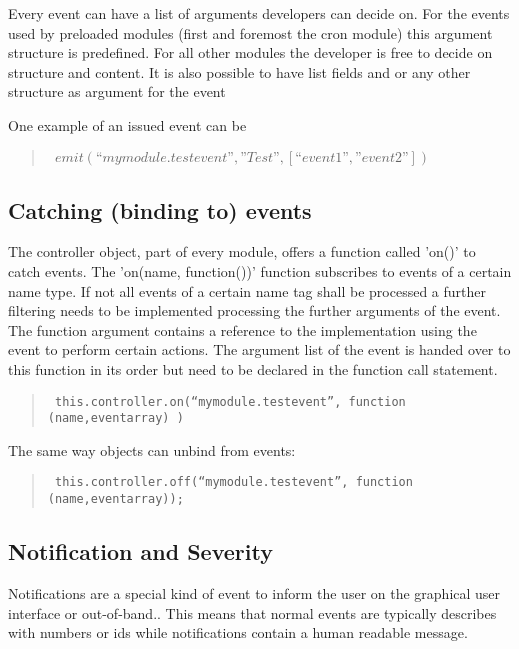 Every event can have a list of arguments developers can decide on. For the events used by 
preloaded modules (first and foremost the cron module) this argument structure is 
predefined. For all other modules the developer is free to decide on structure and content. 
It is also possible to have list fields and or any other structure as argument for the event

One example of an issued event can be 

\begin{quote}
\texttt{  
$emit(“mymodule.testevent”,”Test”,[“event1”,”event2”])$
}
\end{quote}

\subsection{Catching (binding to) events}

The controller object, part of every module, offers a function called 'on()' to catch events. 
The 'on(name, function())' function subscribes to events of a certain name type. If not 
all  events of a certain name tag shall be processed a further filtering needs to be 
implemented  processing  the further arguments of the event. The function argument contains a reference 
to the implementation using the event to perform certain actions. The argument list of the event is 
handed over to this function in its order but need to be declared in the function call statement.

\begin{quote}
\texttt{  
this.controller.on(“mymodule.testevent”, function (name,eventarray) {})
}
\end{quote}

The same way objects can unbind from events:

\begin{quote}
\texttt{  
this.controller.off(“mymodule.testevent”, function (name,eventarray));
}
\end{quote}

\subsection{Notification and Severity}

Notifications are a special  kind of event to inform the user on the graphical user interface or 
out-of-band.. This means that normal events are typically describes with numbers or ids 
while notifications contain a human readable message. 
 
